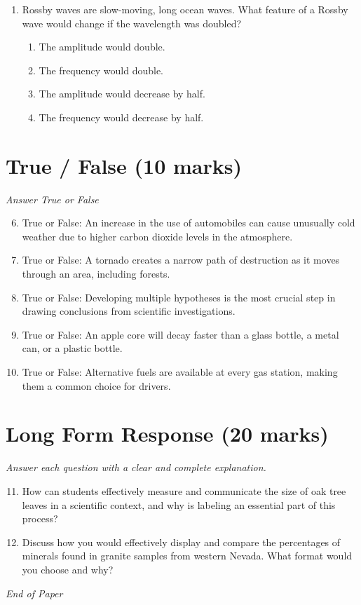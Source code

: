 \documentclass[12pt]{article}
\begin{document}
\begin{enumerate}[label=\arabic*.]
\begin{enumerate}[label=(\alph*)]
    \item The mass of water increased.
    \item The water took a definite shape.
    \item The flavor of the water changed.
\end{enumerate}
\item Rossby waves are slow-moving, long ocean waves. What feature of a Rossby wave would change if the wavelength was doubled?
\begin{enumerate}[label=(\alph*)]
    \item The amplitude would double.
    \item The frequency would double.
    \item The amplitude would decrease by half.
    \item The frequency would decrease by half.
\end{enumerate}
\end{enumerate}

\section*{True / False (10 marks)}
\textit{Answer True or False}
\begin{enumerate}[label=\arabic*.]
\setcounter{enumi}{5}
\item True or False: An increase in the use of automobiles can cause unusually cold weather due to higher carbon dioxide levels in the atmosphere.
\item True or False: A tornado creates a narrow path of destruction as it moves through an area, including forests.
\item True or False: Developing multiple hypotheses is the most crucial step in drawing conclusions from scientific investigations.
\item True or False: An apple core will decay faster than a glass bottle, a metal can, or a plastic bottle.
\item True or False: Alternative fuels are available at every gas station, making them a common choice for drivers.
\end{enumerate}

\section*{Long Form Response (20 marks)}
\textit{Answer each question with a clear and complete explanation.}
\begin{enumerate}[label=\arabic*.]
\setcounter{enumi}{10}
\item How can students effectively measure and communicate the size of oak tree leaves in a scientific context, and why is labeling an essential part of this process?
\item Discuss how you would effectively display and compare the percentages of minerals found in granite samples from western Nevada. What format would you choose and why?
\end{enumerate}

\vfill
\noindent\textit{End of Paper}
\end{document}
